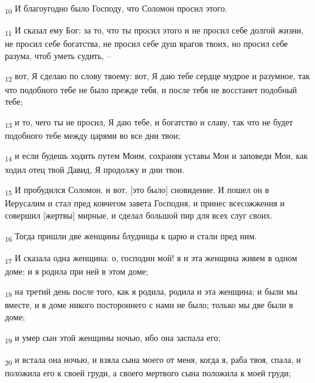 \begin{tcolorbox}
\textsubscript{10} И благоугодно было Господу, что Соломон просил этого.
\end{tcolorbox}
\begin{tcolorbox}
\textsubscript{11} И сказал ему Бог: за то, что ты просил этого и не просил себе долгой жизни, не просил себе богатства, не просил себе душ врагов твоих, но просил себе разума, чтоб уметь судить, --
\end{tcolorbox}
\begin{tcolorbox}
\textsubscript{12} вот, Я сделаю по слову твоему: вот, Я даю тебе сердце мудрое и разумное, так что подобного тебе не было прежде тебя, и после тебя не восстанет подобный тебе;
\end{tcolorbox}
\begin{tcolorbox}
\textsubscript{13} и то, чего ты не просил, Я даю тебе, и богатство и славу, так что не будет подобного тебе между царями во все дни твои;
\end{tcolorbox}
\begin{tcolorbox}
\textsubscript{14} и если будешь ходить путем Моим, сохраняя уставы Мои и заповеди Мои, как ходил отец твой Давид, Я продолжу и дни твои.
\end{tcolorbox}
\begin{tcolorbox}
\textsubscript{15} И пробудился Соломон, и вот, [это было] сновидение. И пошел он в Иерусалим и стал пред ковчегом завета Господня, и принес всесожжения и совершил [жертвы] мирные, и сделал большой пир для всех слуг своих.
\end{tcolorbox}
\begin{tcolorbox}
\textsubscript{16} Тогда пришли две женщины блудницы к царю и стали пред ним.
\end{tcolorbox}
\begin{tcolorbox}
\textsubscript{17} И сказала одна женщина: о, господин мой! я и эта женщина живем в одном доме; и я родила при ней в этом доме;
\end{tcolorbox}
\begin{tcolorbox}
\textsubscript{18} на третий день после того, как я родила, родила и эта женщина; и были мы вместе, и в доме никого постороннего с нами не было; только мы две были в доме;
\end{tcolorbox}
\begin{tcolorbox}
\textsubscript{19} и умер сын этой женщины ночью, ибо она заспала его;
\end{tcolorbox}
\begin{tcolorbox}
\textsubscript{20} и встала она ночью, и взяла сына моего от меня, когда я, раба твоя, спала, и положила его к своей груди, а своего мертвого сына положила к моей груди;
\end{tcolorbox}
